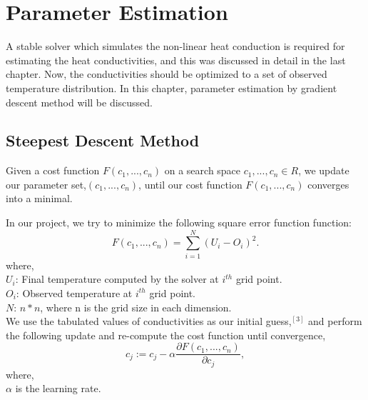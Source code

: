 \documentclass[10pt,a4paper]{report}
\newcommand{\argmin}{\mathop{\rm arg~min}\limits}
\begin{document}
\chapter{Parameter Estimation}
A stable solver which simulates the non-linear heat conduction is required for estimating the heat conductivities, and this was discussed in detail in the last chapter. Now, the conductivities should be optimized to a set of observed temperature distribution. In this chapter, parameter estimation by  gradient descent method will be discussed. 
\section{Steepest Descent Method}

Given a cost function $F(c_1,...,c_n)$ on a search space $c_1,...,c_n \in R$, we update our parameter set,$(c_1,...,c_n)$, until our cost function $F(c_1,...,c_n)$ converges into a minimal. 


In our project, we try to minimize the following square error function function:
\begin{equation}
 F(c_1,...,c_n)= \sum\limits_{i=1}^N (U_i-O_i)^2          .
\end{equation} \[\] 
where,\\
$U_i$: Final temperature computed by the solver at $i^{th}$ grid point.\\
$O_i$: Observed temperature at $i^{th}$ grid point.\\
$N$: $n*n$, where n is the grid size in each dimension.\\

We use the tabulated values of conductivities as our initial guess,$^{[3]}$ and perform the following update and re-compute the cost function until convergence,
\begin{equation}
c_j := c_j - \alpha{\frac{\partial F(c_1,...,c_n)}{\partial c_j}},
\end{equation}
where,\\
 $\alpha$ is the learning rate. \\
 
\end{document}
